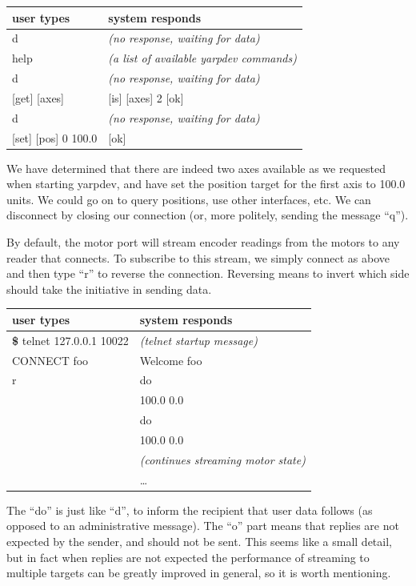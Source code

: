 \begin{center}
\begin{tabular}{ll}
\hline\hline
{\bf user types} & {\bf system responds} \\
\hline
 d & {\it (no response, waiting for data)} \\
 help & {\it (a list of available yarpdev commands)} \\
 d & {\it (no response, waiting for data)} \\
 {[get] [axes]} &  {[is] [axes] 2 [ok]} \\
 d & {\it (no response, waiting for data)} \\
 {[set] [pos] 0 100.0} & {[ok]} \\
\hline\hline
\end{tabular}
\end{center}

We have determined that there are indeed two axes available as we requested
when starting yarpdev, and have set the position target for the
first axis to 100.0 units.  We could go on to query positions, use
other interfaces, etc.  We can disconnect by closing our connection
(or, more politely, sending the message ``q'').

By default, the motor port will stream encoder readings from the motors
to any reader that connects.  To subscribe to this stream, we simply
connect as above and then type ``r'' to reverse the connection.
Reversing means to invert which side should take the initiative
in sending data.


\begin{center}
\begin{tabular}{ll}
\hline\hline
{\bf user types} & {\bf system responds} \\
\hline
{\bf \$} telnet 127.0.0.1 10022 & {\it (telnet startup message)} \\
CONNECT foo & Welcome foo \\
r & do \\
& 100.0 0.0 \\
 & do \\
 & 100.0 0.0 \\
 & {\it (continues streaming motor state)} \\
 & \ldots \\
\hline\hline
\end{tabular}
\end{center}


The ``do'' is just like ``d'', to inform the recipient that user data
follows (as opposed to an administrative message).  
The ``o'' part means that replies are not expected by the
sender, and should not be sent.  This seems like a small detail,
but in fact when replies are not expected the performance of 
streaming to multiple targets can be greatly improved in general,
so it is worth mentioning.

